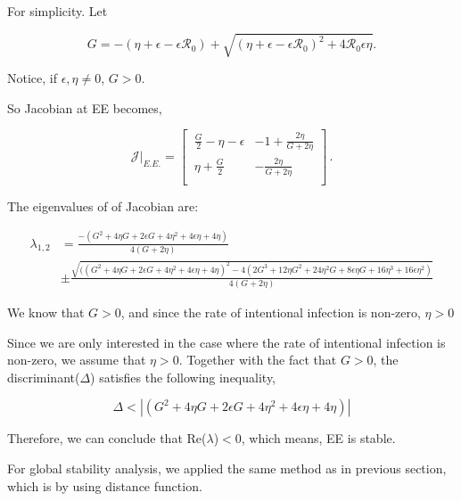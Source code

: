 \documentclass[12pt]{article}
\newcommand{\R}{\mathcal{R}}
\begin{document}
For simplicity. Let 
\begin{linenomath*}
\begin{equation}
G=-(\eta+\epsilon-\epsilon\R_0)+\sqrt{(\eta+\epsilon-\epsilon\R_0)^2+4\R_0\epsilon \eta}.
\end{equation}
\end{linenomath*}
Notice, if $\epsilon,\eta\neq 0$, $G>0$. 

So Jacobian at EE becomes,
\begin{linenomath*}
\begin{equation}
\mathcal{J}|_{E.E.}=
\begin{bmatrix}
    \ \frac{G}{2}-\eta-\epsilon       & -1+\frac{2\eta}{G+2\eta} \\
    \ \eta+\frac{G}{2}       & -\frac{2\eta}{G+2\eta} \\
\end{bmatrix}\,.
\end{equation}
\end{linenomath*}

The eigenvalues of of Jacobian are:

\begin{linenomath*}
\begin{align}
\lambda_{1,2} &= \frac{-(G^2+4\eta G+2\epsilon G+4\eta^2+4\epsilon\eta+4\eta) }{4(G+2\eta)}\\
& \pm \frac{\sqrt{((G^2+4\eta G+2\epsilon G+4\eta^2+4\epsilon\eta+4\eta)^2-4(2G^3+12\eta G^2+24\eta^2 G+8\epsilon\eta G+16\eta^3+16\epsilon\eta^2)}}{4(G+2\eta)}
\end{align}
\end{linenomath*}

We know that $G>0$, and since the rate of intentional infection is non-zero, $\eta >0$

Since we are only interested in the case where the rate of intentional infection is non-zero, we assume that $\eta>0$. Together with the fact that $G>0$, the discriminant($\Delta$) satisfies the following inequality,
\begin{linenomath*}
\begin{equation}
\Delta<|(G^2+4\eta G+2\epsilon G+4\eta^2+4\epsilon\eta+4\eta)|
\end{equation}
\end{linenomath*}

Therefore, we can conclude that Re($\lambda$)$<0$, which means, EE is stable.

For global stability analysis, we applied the same method as in previous section, which is by using distance function.
\end{document}
